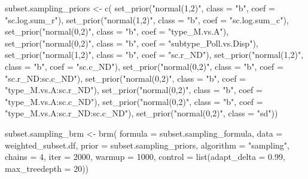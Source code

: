 \documentclass[11pt,]{article}
\newenvironment{Shaded}{}{}
\newcommand{\KeywordTok}[1]{\textcolor[rgb]{0.00,0.00,1.00}{#1}}
\newcommand{\DataTypeTok}[1]{#1}
\newcommand{\DecValTok}[1]{#1}
\newcommand{\FloatTok}[1]{#1}
\newcommand{\StringTok}[1]{\textcolor[rgb]{0.00,0.50,0.50}{#1}}
\newcommand{\NormalTok}[1]{#1}
\begin{document}
\begin{Shaded}
\begin{Highlighting}[]
\NormalTok{subset.sampling_priors <-}\StringTok{ }\KeywordTok{c}\NormalTok{(}
  \KeywordTok{set_prior}\NormalTok{(}\StringTok{"normal(1,2)"}\NormalTok{, }\DataTypeTok{class =} \StringTok{"b"}\NormalTok{, }\DataTypeTok{coef =} \StringTok{"sc.log.sum_r"}\NormalTok{),}
  \KeywordTok{set_prior}\NormalTok{(}\StringTok{"normal(1,2)"}\NormalTok{, }\DataTypeTok{class =} \StringTok{"b"}\NormalTok{, }\DataTypeTok{coef =} \StringTok{"sc.log.sum_c"}\NormalTok{),}
  \KeywordTok{set_prior}\NormalTok{(}\StringTok{"normal(0,2)"}\NormalTok{, }\DataTypeTok{class =} \StringTok{"b"}\NormalTok{, }\DataTypeTok{coef =} \StringTok{"type_M.vs.A"}\NormalTok{),}
  \KeywordTok{set_prior}\NormalTok{(}\StringTok{"normal(0,2)"}\NormalTok{, }\DataTypeTok{class =} \StringTok{"b"}\NormalTok{, }\DataTypeTok{coef =} \StringTok{"subtype_Poll.vs.Disp"}\NormalTok{),}
  \KeywordTok{set_prior}\NormalTok{(}\StringTok{"normal(1,2)"}\NormalTok{, }\DataTypeTok{class =} \StringTok{"b"}\NormalTok{, }\DataTypeTok{coef =} \StringTok{"sc.r_ND"}\NormalTok{),}
  \KeywordTok{set_prior}\NormalTok{(}\StringTok{"normal(1,2)"}\NormalTok{, }\DataTypeTok{class =} \StringTok{"b"}\NormalTok{, }\DataTypeTok{coef =} \StringTok{"sc.c_ND"}\NormalTok{),}
  \KeywordTok{set_prior}\NormalTok{(}\StringTok{"normal(0,2)"}\NormalTok{, }\DataTypeTok{class =} \StringTok{"b"}\NormalTok{, }\DataTypeTok{coef =} \StringTok{"sc.r_ND:sc.c_ND"}\NormalTok{),}
  \KeywordTok{set_prior}\NormalTok{(}\StringTok{"normal(0,2)"}\NormalTok{, }\DataTypeTok{class =} \StringTok{"b"}\NormalTok{, }\DataTypeTok{coef =} \StringTok{"type_M.vs.A:sc.r_ND"}\NormalTok{),}
  \KeywordTok{set_prior}\NormalTok{(}\StringTok{"normal(0,2)"}\NormalTok{, }\DataTypeTok{class =} \StringTok{"b"}\NormalTok{, }\DataTypeTok{coef =} \StringTok{"type_M.vs.A:sc.c_ND"}\NormalTok{),}
  \KeywordTok{set_prior}\NormalTok{(}\StringTok{"normal(0,2)"}\NormalTok{, }\DataTypeTok{class =} \StringTok{"b"}\NormalTok{, }\DataTypeTok{coef =} \StringTok{"type_M.vs.A:sc.r_ND:sc.c_ND"}\NormalTok{),}
  \KeywordTok{set_prior}\NormalTok{(}\StringTok{"normal(0,2)"}\NormalTok{, }\DataTypeTok{class =} \StringTok{"sd"}\NormalTok{))}

\NormalTok{subset.sampling_brm <-}\StringTok{ }\KeywordTok{brm}\NormalTok{(}
  \DataTypeTok{formula =}\NormalTok{ subset.sampling_formula, }\DataTypeTok{data =}\NormalTok{ weighted_subset.df, }
  \DataTypeTok{prior =}\NormalTok{ subset.sampling_priors, }\DataTypeTok{algorithm =} \StringTok{"sampling"}\NormalTok{, }
  \DataTypeTok{chains =} \DecValTok{4}\NormalTok{, }\DataTypeTok{iter =} \DecValTok{2000}\NormalTok{, }\DataTypeTok{warmup =} \DecValTok{1000}\NormalTok{, }
  \DataTypeTok{control =} \KeywordTok{list}\NormalTok{(}\DataTypeTok{adapt_delta =} \FloatTok{0.99}\NormalTok{, }\DataTypeTok{max_treedepth =} \DecValTok{20}\NormalTok{))}
\end{Highlighting}
\end{Shaded}
\end{document}
